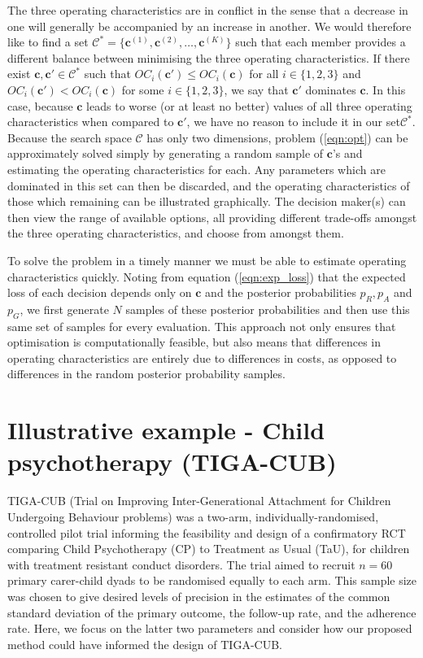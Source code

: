 \documentclass[AMA,STIX1COL]{WileyNJD-v2}
\begin{document}
The three operating characteristics are in conflict in the sense that a decrease in one will generally be accompanied by an increase in another. We would therefore like to find a set $\mathcal{C}^* = \{ \mathbf{c}^{(1)}, \mathbf{c}^{(2)}, \ldots, \mathbf{c}^{(K)} \}$ such that each member provides a different balance between minimising the three operating characteristics. If there exist $\mathbf{c}, \mathbf{c}' \in \mathcal{C}^*$ such that $OC_i(\mathbf{c}') \leq OC_i(\mathbf{c})$ for all $i \in \{1, 2, 3\}$ and $OC_i(\mathbf{c}') < OC_i(\mathbf{c})$ for some $i \in \{1, 2, 3\}$, we say that $\mathbf{c}'$ dominates $\mathbf{c}$. In this case, because $\mathbf{c}$ leads to worse (or at least no better) values of all three operating characteristics when compared to $\mathbf{c}'$, we have no reason to include it in our set$\mathcal{C}^*$. Because the search space $\mathcal{C}$ has only two dimensions, problem (\ref{eqn:opt}) can be approximately solved simply by generating a random sample of $\mathbf{c}$'s and estimating the operating characteristics for each. Any parameters which are dominated in this set can then be discarded, and the operating characteristics of those which remaining can be illustrated graphically. The decision maker(s) can then view the range of available options, all providing different trade-offs amongst the three operating characteristics, and choose from amongst them. 

To solve the problem in a timely manner we must be able to estimate operating characteristics quickly. Noting from equation (\ref{eqn:exp_loss}) that the expected loss of each decision depends only on $\mathbf{c}$ and the posterior probabilities $p_R, p_A$ and $p_G$, we first generate $N$ samples of these posterior probabilities and then use this same set of samples for every evaluation. This approach not only ensures that optimisation is computationally feasible, but also means that differences in operating characteristics are entirely due to differences in costs, as opposed to differences in the random posterior probability samples.

\section{Illustrative example - Child psychotherapy (TIGA-CUB)}\label{sec:TIGA}

TIGA-CUB (Trial on Improving Inter-Generational Attachment for Children Undergoing Behaviour problems) was a two-arm, individually-randomised, controlled pilot trial informing the feasibility and design of a confirmatory RCT comparing Child Psychotherapy (CP) to Treatment as Usual (TaU), for children with
treatment resistant conduct disorders. The trial aimed to recruit $n=60$ primary carer-child dyads to be randomised equally to each arm. This sample size was chosen to give desired levels of precision in the estimates of the common standard deviation of the primary outcome, the follow-up rate, and the adherence rate. Here, we focus on the latter two parameters and consider how our proposed method could have informed the design of TIGA-CUB.
\end{document}
